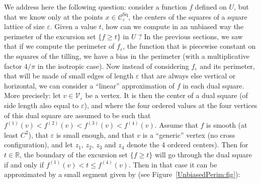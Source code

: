 \documentclass[10pt]{amsart}
\theoremstyle{definition}\newtheorem{defi}[theo]{Definition}\newtheorem{rema}[theo]{Remark}\newtheorem{exam}[theo]{Example}\newtheorem{exem}[theo]{Example}\newtheorem{nota}[theo]{Notation}
\newcommand{\R}{\mathbb{R}}
\newcommand{\eps}{\varepsilon}
\DeclareMathOperator{\Sq}{Sq}
\newcommand{\calC}{\mathcal{C}}
\newcommand{\calV}{\mathcal{V}}
\begin{document}
We address here the following question: consider a function $f$ defined on $U$, but that we know only at the points $x\in\calC_\eps^{\Sq}$, the centers of the squares of a square lattice of size $\eps$. Given a value $t$, how can we compute in an unbiased way the perimeter of the excursion set $\{ f\ge t\}$ in $U$ ? In the previous sections, we saw that if we compute the perimeter of $f_\eps$, the function that is piecewise constant on the squares of the tilling, we have a bias in the perimeter (with a multiplicative factor $4/\pi$ in the isotropic case). Now instead of considering $f_\eps$ and its perimeter, that will be made of small edges of length $\eps$ that are always else vertical or horizontal, we can consider a ``linear'' approximation of $f$ in each dual square. More precisely: let $v\in\calV_\eps$ be a vertex. It is then the center of a dual square (of side length also equal to $\eps$), and where the four ordered values at the four vertices of this dual square are assumed to be such that $f^{(1)}(v)< f^{(2)}(v)< f^{(3)}(v)< f^{(4)}(v)$. Assume that $f$ is smooth (at least $C^2$), that $\eps$ is small enough, and that $v$ is a ``generic'' vertex (no cross configuration), and let $z_1$, $z_2$, $z_3$ and $z_4$ denote the 4 ordered centers). Then for $t\in\R$, the boundary of the excursion set $\{ f\ge t\}$ will go through the dual square if and only if $f^{(1)}(v)< t\leq f^{(4)}(v)$. Then in that case it can be approximated by a small segment given by (see Figure~\ref{UnbiasedPerim:fig}):
\end{document}

